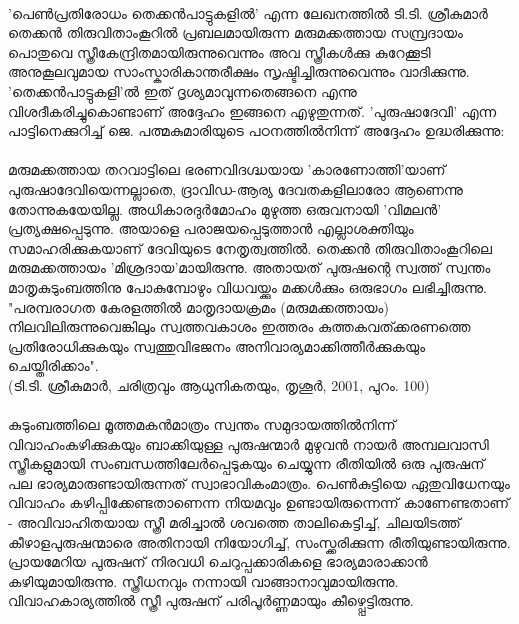 \label{ch2box3} %
\begin{tcolorbox}[%
  breakable, %
  arc=0mm, 
  left=1pt, right = 1pt, 
  boxrule=0mm,
  colback = {blue!10}, %
] 

\paragraph{}'പെൺപ്രതിരോധം തെക്കൻപാട്ടുകളിൽ' എന്ന ലേഖനത്തിൽ ടി.ടി. ശ്രീകുമാർ തെക്കൻ തിരുവിതാംകൂറിൽ പ്രബലമായിരുന്ന മരുമക്കത്തായ സമ്പ്രദായം പൊതുവെ സ്ത്രീകേന്ദ്രിതമായിരുന്നുവെന്നും അവ സ്ത്രീകൾക്കു കുറേക്കൂടി അനുകൂലവുമായ സാംസ്കാരികാന്തരീക്ഷം സൃഷ്ടിച്ചിരുന്നുവെന്നും വാദിക്കുന്നു. 'തെക്കൻപാട്ടുകളി'ൽ ഇത് ദൃശ്യമാവുന്നതെങ്ങനെ എന്നു വിശദീകരിച്ചുകൊണ്ടാണ് അദ്ദേഹം ഇങ്ങനെ എഴുതുന്നത്. 'പുരുഷാദേവി' എന്ന പാട്ടിനെക്കുറിച്ച് ജെ. പത്മകുമാരിയുടെ പഠനത്തിൽനിന്ന് അദ്ദേഹം ഉദ്ധരിക്കുന്നു:
\begin{tcolorbox}{}
\paragraph{}
 മരുമക്കത്തായ തറവാട്ടിലെ ഭരണവിദഗ്ദ്ധയായ 'കാരണോത്തി'യാണ് പുരുഷാദേവിയെന്നല്ലാതെ, ദ്രാവിഡ-ആര്യ ദേവതകളിലാരോ ആണെന്നു തോന്നുകയേയില്ല. അധികാരദുർമോഹം മുഴുത്ത ഒരുവനായി 'വിമലൻ' പ്രത്യക്ഷപ്പെടുന്നു. അയാളെ പരാജയപ്പെടുത്താൻ എല്ലാശക്തിയും സമാഹരിക്കുകയാണ് ദേവിയുടെ നേതൃത്വത്തിൽ. തെക്കൻ തിരുവിതാംകൂറിലെ മരുമക്കത്തായം 'മിശ്രദായ'മായിരുന്നു. അതായത് പുരുഷന്റെ സ്വത്ത് സ്വന്തം മാതൃകുടുംബത്തിനു പോകുമ്പോഴും വിധവയ്ക്കും മക്കൾക്കും ഒരുഭാഗം ലഭിച്ചിരുന്നു. "പരമ്പരാഗത കേരളത്തിൽ മാതൃദായക്രമം (മരുമക്കത്തായം) നിലവിലിരുന്നുവെങ്കിലും സ്വത്തവകാശം ഇത്തരം കുത്തകവത്ക്കരണത്തെ പ്രതിരോധിക്കുകയും സ്വത്തുവിഭജനം അനിവാര്യമാക്കിത്തീർക്കുകയും ചെയ്തിരിക്കാം".\\(ടി.ടി. ശ്രീകുമാർ, ചരിത്രവും ആധുനികതയും, തൃശൂർ, 2001, പുറം. 100)
 \end{tcolorbox}

\end{tcolorbox}

\paragraph{}കുടുംബത്തിലെ മൂത്തമകൻമാത്രം സ്വന്തം സമുദായത്തിൽനിന്ന് വിവാഹംകഴിക്കുകയും ബാക്കിയുള്ള പുരുഷന്മാർ മുഴുവൻ നായർ അമ്പലവാസി സ്ത്രീകളുമായി സംബന്ധത്തിലേർപ്പെടുകയും ചെയ്യുന്ന രീതിയിൽ ഒരു പുരുഷന് പല ഭാര്യമാരുണ്ടായിരുന്നത് സ്വാഭാവികംമാത്രം. പെൺകുട്ടിയെ ഏതുവിധേനയും വിവാഹം കഴിപ്പിക്കേണ്ടതാണെന്ന നിയമവും ഉണ്ടായിരുന്നെന്ന് കാണേണ്ടതാണ് - അവിവാഹിതയായ സ്ത്രീ മരിച്ചാൽ ശവത്തെ താലികെട്ടിച്ച്, ചിലയിടത്ത് കീഴാളപുരുഷന്മാരെ അതിനായി നിയോഗിച്ച്, സംസ്ക്കരിക്കുന്ന രീതിയുണ്ടായിരുന്നു. പ്രായമേറിയ പുരുഷന് നിരവധി ചെറുപ്പക്കാരികളെ ഭാര്യമാരാക്കാൻ കഴിയുമായിരുന്നു. സ്ത്രീധനവും നന്നായി വാങ്ങാനാവുമായിരുന്നു. വിവാഹകാര്യത്തിൽ സ്ത്രീ പുരുഷന് പരിപൂർണ്ണമായും കീഴ്പ്പെട്ടിരുന്നു.

